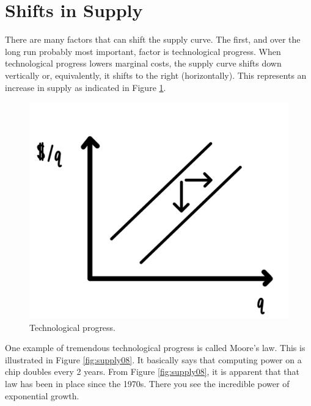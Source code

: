 \documentclass[
]{book}
\begin{document}
\hypertarget{shifts-in-supply}{%
\section{Shifts in Supply}\label{shifts-in-supply}}

There are many factors that can shift the supply curve. The first, and over the long run probably most important, factor is technological progress. When technological progress lowers marginal costs, the supply curve shifts down vertically or, equivalently, it shifts to the right (horizontally). This represents an increase in supply as indicated in Figure \ref{fig:supply07}.

\begin{figure}

{\centering \includegraphics[width=0.75\linewidth]{img/supply/fig7} 

}

\caption{Technological progress.}\label{fig:supply07}
\end{figure}

One example of tremendous technological progress is called Moore's law. This is illustrated in Figure \ref{fig:supply08}. It basically says that computing power on a chip doubles every 2 years. From Figure \ref{fig:supply08}, it is apparent that that law has been in place since the 1970s. There you see the incredible power of exponential growth.
\end{document}
